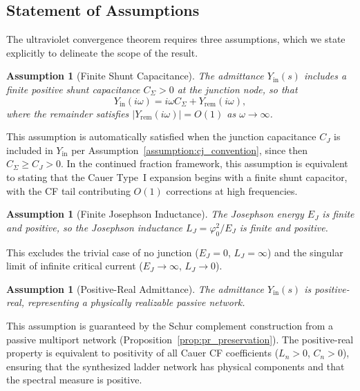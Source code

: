 \documentclass[reprint, floatfix, superscriptaddress, amsmath, amssymb, longbibliography]{revtex4-2}
\newtheorem{assumption}[theorem]{Assumption}
\newcommand{\Yin}{Y_{\mathrm{in}}}
\begin{document}
\subsection{Statement of Assumptions}
\label{sec:uv_assumptions}

The ultraviolet convergence theorem requires three assumptions, which we state explicitly to delineate the scope of the result.

\begin{assumption}[Finite Shunt Capacitance]
\label{assumption:uv_capacitance}
The admittance $\Yin(s)$ includes a finite positive shunt capacitance $C_\Sigma > 0$ at the junction node, so that
\begin{equation}
\Yin(i\omega) = i\omega C_\Sigma + Y_{\mathrm{rem}}(i\omega),
\label{eq:Y_high_freq}
\end{equation}
where the remainder satisfies $|Y_{\mathrm{rem}}(i\omega)| = O(1)$ as $\omega \to \infty$.
\end{assumption}

This assumption is automatically satisfied when the junction capacitance $C_J$ is included in $\Yin$ per Assumption~\ref{assumption:cj_convention}, since then $C_\Sigma \geq C_J > 0$. In the continued fraction framework, this assumption is equivalent to stating that the Cauer Type~I expansion begins with a finite shunt capacitor, with the CF tail contributing $O(1)$ corrections at high frequencies.

\begin{assumption}[Finite Josephson Inductance]
\label{assumption:uv_inductance}
The Josephson energy $E_J$ is finite and positive, so the Josephson inductance $L_J = \varphi_0^2/E_J$ is finite and positive.
\end{assumption}

This excludes the trivial case of no junction ($E_J = 0$, $L_J = \infty$) and the singular limit of infinite critical current ($E_J \to \infty$, $L_J \to 0$).

\begin{assumption}[Positive-Real Admittance]
\label{assumption:uv_pr}
The admittance $\Yin(s)$ is positive-real, representing a physically realizable passive network.
\end{assumption}

This assumption is guaranteed by the Schur complement construction from a passive multiport network (Proposition~\ref{prop:pr_preservation}). The positive-real property is equivalent to positivity of all Cauer CF coefficients ($L_n > 0$, $C_n > 0$), ensuring that the synthesized ladder network has physical components and that the spectral measure is positive.
\end{document}
